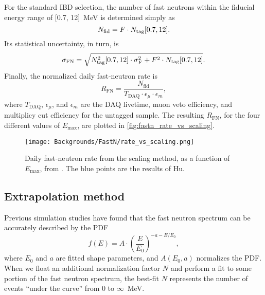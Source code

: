 \documentclass[../thesis.tex]{subfiles}
\begin{document}
\def\nfn{\ensuremath{N_\mathrm{fid}}} \def\rfn{\ensuremath{R_\mathrm{FN}}}

For the standard IBD selection, the number of fast neutrons within the fiducial energy range of [0.7, 12]~MeV is determined simply as
\[ \nfn = F \cdot \ntag[0.7, 12]. \] Its statistical uncertainty, in turn, is
\begin{equation}
  \label{eq:fastn_scal_unc}
  \sigma_\mathrm{FN} = \sqrt{N_\mathrm{tag}^2[0.7, 12]
    \cdot \sigma_F^2 + F^2 \cdot N_\mathrm{tag}[0.7, 12]}.
\end{equation}
Finally, the normalized daily fast-neutron rate is
\begin{equation}
  \label{eq:fastn_rate}
  \rfn = \frac{\nfn}{T_\mathrm{DAQ} \cdot \epsilon_\mu \cdot \epsilon_m},
\end{equation}
where $T_\mathrm{DAQ}$, $\epsilon_\mu$, and $\epsilon_m$ are the DAQ livetime, muon veto efficiency, and multiplicy cut efficiency for the untagged sample. The resulting $\rfn$, for the four different values of $E_{\mathrm{max}}$, are plotted in \autoref{fig:fastn_rate_vs_scaling}.


\begin{figure}[h]
  \texttt{[image: Backgrounds/FastN/rate\_vs\_scaling.png]}
  \caption{Daily fast-neutron rate from the scaling method, as a function of $E_{\mathrm{max}}$, from \cite{fastn}. The blue points are the results of Hu.}
  \label{fig:fastn_rate_vs_scaling}
\end{figure}

\subsection{Extrapolation method}
\label{sec:fastn_extrap}

Previous simulation studies have found that the fast neutron spectrum can be accurately described by the PDF
\begin{equation}
  \label{eq:bkgFastnShape}
  f(E) = A \cdot \left( \frac{E}{E_0} \right)^{-a-E/E_0},  
\end{equation}
where $E_0$ and $a$ are fitted shape parameters, and $A(E_0, a)$ normalizes the PDF. When we float an additional normalization factor $N$ and perform a fit to some portion of the fast neutron spectrum, the best-fit $N$ represents the number of events ``under the curve'' from 0 to $\infty$~MeV.
\end{document}
